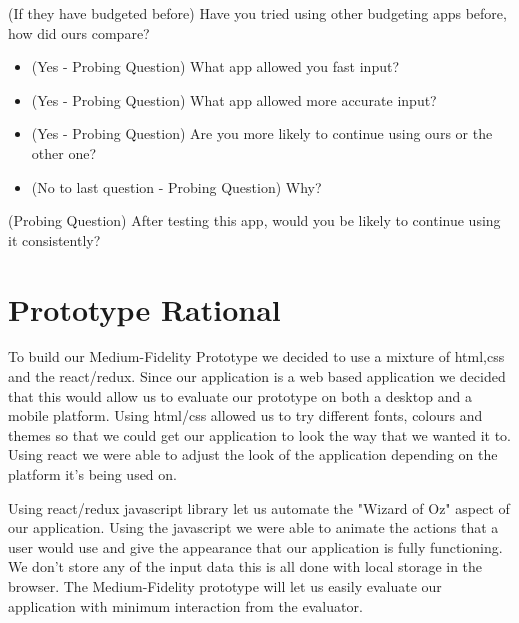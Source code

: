 \documentclass{chi2011}
\begin{document}
	(If they have budgeted before) Have you tried using other budgeting apps before, how did ours compare?
	\begin{itemize}
	\item (Yes - Probing Question) What app allowed you fast input?
	\item (Yes - Probing Question) What app allowed more accurate input?
	\item (Yes - Probing Question) Are you more likely to continue using ours or the other one?
	\item (No to last question - Probing Question) Why?
	\end{itemize}
	(Probing Question) After testing this app, would you be likely to continue using it consistently? 

	\section{Prototype Rational}

	To build our Medium-Fidelity Prototype we decided to use a mixture of
	html,css and the react/redux. Since our application is a web based
	application we decided that this would allow us to evaluate our prototype on
	both a desktop and a mobile platform. Using html/css allowed us to try
	different fonts, colours and themes so that we could get our application to
	look the way that we wanted it to. Using react we were able to adjust the
	look of the application depending on the platform it's being used on.

	Using react/redux javascript library let us automate the "Wizard of Oz"
	aspect of our application. Using the javascript we were able to animate the
	actions that a user would use and give the appearance that our application is
	fully functioning. We don't store any of the input data this is all done
	with local storage in the browser. The Medium-Fidelity prototype will let
	us easily evaluate our application with minimum interaction from the
	evaluator. 



\end{document}
